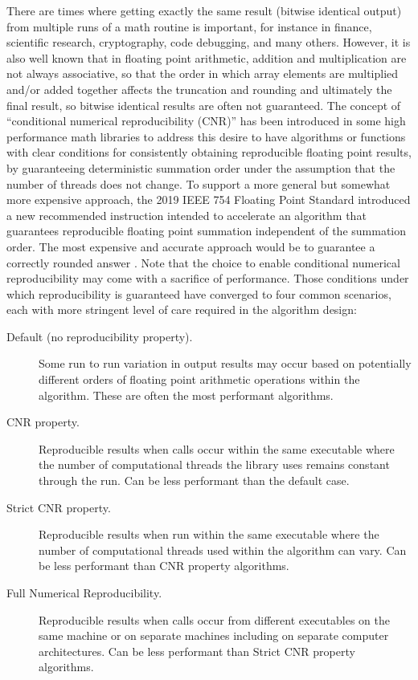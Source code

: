 \documentclass[manuscript,review]{acmart}
\begin{document}
There are times where getting exactly the same result (bitwise identical output) from multiple runs of a math routine is important, for instance in finance, scientific research, cryptography, code debugging, and many others.  However, it is also well known that in floating point arithmetic, addition and multiplication are not always associative, so that the order in which array elements are multiplied and/or added together affects the truncation and rounding and ultimately the final result, so bitwise identical results are often not guaranteed.  The concept of ``conditional numerical reproducibility (CNR)'' has been introduced in some high performance math libraries to address this desire to have algorithms or functions with clear conditions for consistently obtaining reproducible floating point results, by guaranteeing
deterministic summation order under the assumption
that the number of threads does not change.
To support a more general but somewhat more expensive approach, the 2019 IEEE 754 Floating Point Standard \cite[Sec. 9.5]{IEEE754} introduced a new
recommended instruction intended to
accelerate an algorithm 
\cite{ADN:2020:ReproBLAS}
that guarantees reproducible
floating point summation independent 
of the summation order. The most expensive and
accurate approach would be to guarantee a
correctly rounded answer \cite{KulischMiranker1981,ExactDotProduct}.
Note that the choice to enable conditional numerical reproducibility may come with a sacrifice of performance. Those conditions under which reproducibility is guaranteed have converged to four common scenarios, each with more stringent level of care required in the algorithm design:
\begin{description}
\item [Default (no reproducibility property).] Some run to run variation in output results may occur based on potentially different orders of floating point arithmetic operations within the algorithm.  These are often the most performant algorithms.
\item [CNR property.] Reproducible results when calls occur within the same executable where the number of computational threads the library uses remains constant through the run. Can be less performant than the default case.
\item [Strict CNR property.] Reproducible results when run within the same executable where the number of computational threads used within the algorithm can vary. Can be less performant than CNR property algorithms.
\item [Full Numerical Reproducibility.] Reproducible results when calls occur from different executables on the same machine or on separate machines including on separate computer architectures.  Can be less performant than Strict CNR property algorithms.
\end{description}
\end{document}
